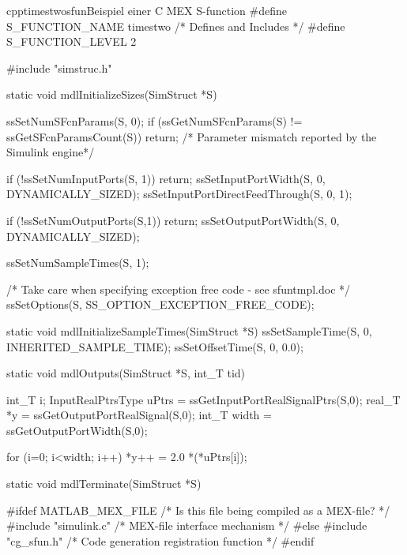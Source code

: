 \begin{codeblock}{cpp}{timestwosfun}{Beispiel einer C MEX S-function \cite{CreateBasicMEX}}
#define S_FUNCTION_NAME timestwo /* Defines and Includes */
#define S_FUNCTION_LEVEL 2

#include "simstruc.h"

static void mdlInitializeSizes(SimStruct *S)
{
    ssSetNumSFcnParams(S, 0);
    if (ssGetNumSFcnParams(S) != ssGetSFcnParamsCount(S)) {
        return; /* Parameter mismatch reported by the Simulink engine*/
    }

    if (!ssSetNumInputPorts(S, 1)) return;
    ssSetInputPortWidth(S, 0, DYNAMICALLY_SIZED);
    ssSetInputPortDirectFeedThrough(S, 0, 1);

    if (!ssSetNumOutputPorts(S,1)) return;
    ssSetOutputPortWidth(S, 0, DYNAMICALLY_SIZED);

    ssSetNumSampleTimes(S, 1);

    /* Take care when specifying exception free code - see sfuntmpl.doc */
    ssSetOptions(S, SS_OPTION_EXCEPTION_FREE_CODE);
    }

static void mdlInitializeSampleTimes(SimStruct *S)
{
    ssSetSampleTime(S, 0, INHERITED_SAMPLE_TIME);
    ssSetOffsetTime(S, 0, 0.0);
}

static void mdlOutputs(SimStruct *S, int_T tid)
{
    int_T i;
    InputRealPtrsType uPtrs = ssGetInputPortRealSignalPtrs(S,0);
    real_T *y = ssGetOutputPortRealSignal(S,0);
    int_T width = ssGetOutputPortWidth(S,0);

    for (i=0; i<width; i++) {
        *y++ = 2.0 *(*uPtrs[i]);
    }
}

static void mdlTerminate(SimStruct *S){}

#ifdef MATLAB_MEX_FILE /* Is this file being compiled as a MEX-file? */
#include "simulink.c" /* MEX-file interface mechanism */
#else
#include "cg_sfun.h" /* Code generation registration function */
#endif

\end{codeblock}



